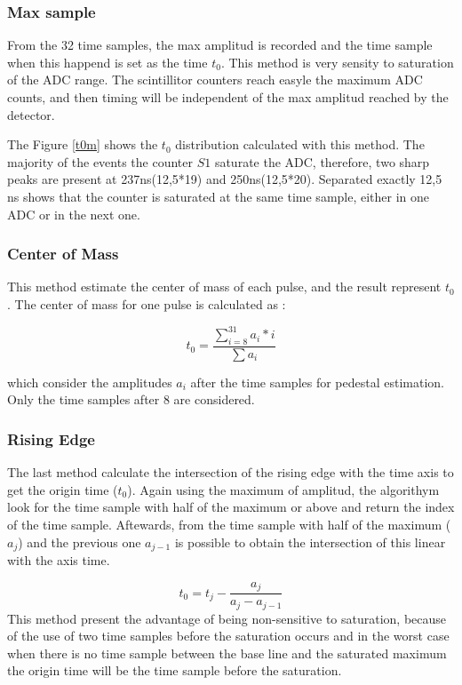 \subsubsection{Max sample}

From the 32 time samples, the max amplitud is recorded and the time sample when this happend is set as the time $t_0$.
This method is very sensity to saturation of the ADC range. The scintillitor counters reach easyle the maximum ADC
counts, and then timing will be independent of the max amplitud reached by the detector.\par
The Figure \ref{t0m} shows the $t_0$ distribution calculated with this method. The majority of the events the counter
$S1$ saturate the ADC, therefore, two sharp peaks are present at 237ns(12,5*19) and 250ns(12,5*20). Separated exactly
12,5 ns  shows that the counter is saturated at the same time sample, either in one ADC or in the next one.\par


\subsubsection{Center of Mass}
This method estimate the center of mass of each pulse, and the result represent $t_0$. The center of mass for one pulse
is calculated as :

\begin{equation}
t_0= \frac{\sum_{i=8}^{31}a_i*i}{\sum a_i}
\end{equation}

which consider the amplitudes $a_i$ after the time samples for pedestal estimation. Only the time samples after 8 are
considered. 

\subsubsection{Rising Edge}

The last method calculate the intersection of the rising edge with the time axis to get the origin time ($t_0$).
Again using the maximum of amplitud, the algorithym look for the time sample with half of the maximum or above and
return the index of the time sample. Aftewards, from the time sample with half of the maximum ($a_{j}$) and the
previous one $a_{j-1}$ is possible to obtain the intersection of this linear with the axis time.\par



\begin{equation}
t_0 = t_j - \frac{a_j}{a_j-a_{j-1}}
\end{equation}
This method present the advantage of being non-sensitive to saturation, because of the use of two time samples before
the saturation occurs and in the worst case when there is no time sample between the base line and the saturated maximum
the origin time will be the time sample before the saturation. \par


